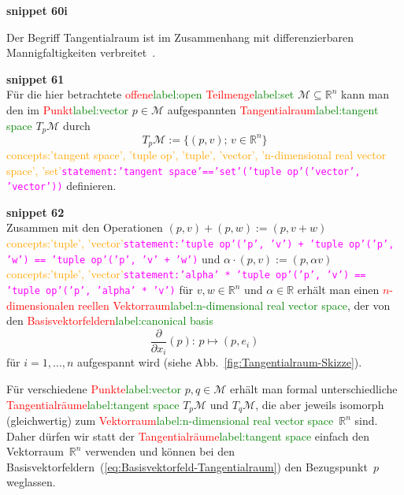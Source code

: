 \documentclass[a4paper,twoside,english,ngerman,deutsch,german,sectrefs,envcountsame,envcountchap]{svmono}
\newcommand{\setref}[2]{\textcolor{red}{#1}\textcolor{green}{#2}}
\newcommand{\snippet}[1]{\textbf{snippet #1}\\}
\newcommand{\eqnote}[2]{\textcolor{orange}{#1}\textcolor{magenta}{\texttt{#2}}}
\begin{document}
\snippet{60i}
\begin{remark}
[Tangentialraum]\label{rem:tangentialraum}Der Begriff Tangentialraum
ist im Zusammenhang mit differenzierbaren Mannigfaltigkeiten verbreitet~\cite{abraham1983,jaenich2005,lee2006}.

\snippet{61}
Für die hier betrachtete \setref{offene}{label:open} \setref{Teilmenge}{label:set} $\mathcal{M}\subseteq{\mathbb{R}}^{n}$
kann man den im \setref{Punkt}{label:vector} $p\in\mathcal{M}$ aufgespannten \setref{Tangentialraum}{label:tangent space}
$T_{p}\mathcal{M}$ durch
\[
T_{p}\mathcal{M}:=\{(p,v);\,v\in{\mathbb{R}}^{n}\}
\]\eqnote{concepts:'tangent space', 'tuple op', 'tuple', 'vector', 'n-dimensional real vector space', 'set'}{statement:'tangent space'=='set'('tuple op'('vector', 'vector'))}
definieren.

\snippet{62}
Zusammen mit den Operationen $(p,v)+(p,w):=(p,v+w)$\eqnote{concepts:'tuple', 'vector'}{statement:'tuple op'('p', 'v') + 'tuple op'('p', 'w') == 'tuple op'('p', 'v' + 'w')} und
$\alpha\cdot(p,v):=(p,\alpha v)$\eqnote{concepts:'tuple', 'vector'}{statement:'alpha' * 'tuple op'('p', 'v') == 'tuple op'('p', 'alpha' * 'v')} für $v,w\in{\mathbb{R}}^{n}$ und $\alpha\in{\mathbb{R}}$
erhält man einen \setref{$n$-dimensionalen reellen Vektorraum}{label:n-dimensional real vector space}, der von den
\setref{Basisvektorfeldern}{label:canonical basis}
\begin{equation}
\frac{\partial}{\partial x_{i}}(p):\,p\mapsto(p,e_{i})\label{eq:Basisvektorfeld-Tangentialraum}
\end{equation}
für $i=1,\ldots,n$ aufgespannt wird (siehe Abb.~\ref{fig:Tangentialraum-Skizze}).

Für verschiedene \setref{Punkte}{label:vector} $p,q\in\mathcal{M}$ erhält man formal unterschiedliche \setref{Tangentialräume}{label:tangent space} $T_{p}\mathcal{M}$ und $T_{q}\mathcal{M}$, die aber jeweils isomorph (gleichwertig) zum \setref{Vektorraum}{label:n-dimensional real vector space}~${\mathbb{R}}^{n}$ sind. Daher dürfen wir statt der \setref{Tangentialräume}{label:tangent space} einfach den Vektor\-raum~$\mathbb{R}^{n}$ verwenden und können bei den Basisvektorfeldern~(\ref{eq:Basisvektorfeld-Tangentialraum}) den Bezugspunkt~$p$ weglassen.
\end{remark}
\end{document}

